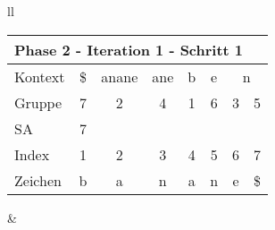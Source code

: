\begin{table}[H]

\centering
\begin{adjustbox}{max width=\textwidth}
\begin{tabular}{ll}

\begin{tabular}{lccccccc}
\multicolumn{8}{l}{Phase 2 - Iteration 1 - Schritt 1}                                                                                                                                             \\ \hline
\multicolumn{1}{l|}{Kontext} & \multicolumn{1}{c|}{\cellcolor[HTML]{\green}\$} & \multicolumn{1}{c|}{anane} & \multicolumn{1}{c|}{ane} & \multicolumn{1}{c|}{b} & \multicolumn{1}{c|}{e} & \multicolumn{2}{c}{n}    \\
\multicolumn{1}{l|}{Gruppe}  & \multicolumn{1}{c|}{\cellcolor[HTML]{\green}7}  & \multicolumn{1}{c|}{2}     & \multicolumn{1}{c|}{4}   & \multicolumn{1}{c|}{1} & \multicolumn{1}{c|}{6} & 3 & 5  \\ 
\multicolumn{1}{l|}{SA}      & \multicolumn{1}{c|}{\cellcolor[HTML]{\green}7}  & \multicolumn{1}{c|}{}      & \multicolumn{1}{c|}{}    & \multicolumn{1}{c|}{}  & \multicolumn{1}{c|}{}  &   &    \\ \hline
\multicolumn{1}{l|}{Index}   & 1                                               & 2                          & 3                        & 4                      & 5                      & 6 & 7  \\
\multicolumn{1}{l|}{Zeichen} & b                                               & a                          & n                        & a                      & n                      & e & \$
\end{tabular}

&


\end{tabular}
\end{adjustbox}
\end{table}

